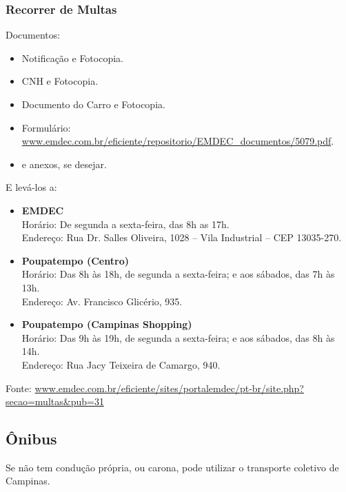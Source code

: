 \subsubsection*{Recorrer de Multas}

Documentos:
\begin{itemize}
    \item  Notificação e Fotocopia.
    \item  CNH e Fotocopia.
    \item  Documento do Carro e Fotocopia.
    \item  Formulário: \url{www.emdec.com.br/eficiente/repositorio/EMDEC_documentos/5079.pdf}.
    \item  e anexos, se desejar.
\end{itemize}

E levá-los a:
\begin{itemize}
    \item   \textbf{EMDEC}
        \\Horário: De segunda a sexta-feira, das 8h as 17h.
        \\Endereço: Rua Dr. Salles Oliveira, 1028 -- Vila Industrial -- CEP 13035-270.
    \item   \textbf{Poupatempo (Centro)}
        \\Horário: Das 8h às 18h, de segunda a sexta-feira; e aos sábados, das 7h às 13h.
        \\Endereço: Av. Francisco Glicério, 935.
    \item   \textbf{Poupatempo (Campinas Shopping)}
        \\Horário: Das 9h às 19h, de segunda a sexta-feira; e aos sábados, das 8h às 14h.
        \\Endereço: Rua Jacy Teixeira de Camargo, 940.
\end{itemize}

Fonte: \url{www.emdec.com.br/eficiente/sites/portalemdec/pt-br/site.php?secao=multas&pub=31}

\subsection{Ônibus}

Se não tem condução própria, ou carona, pode utilizar o transporte coletivo de
Campinas.

